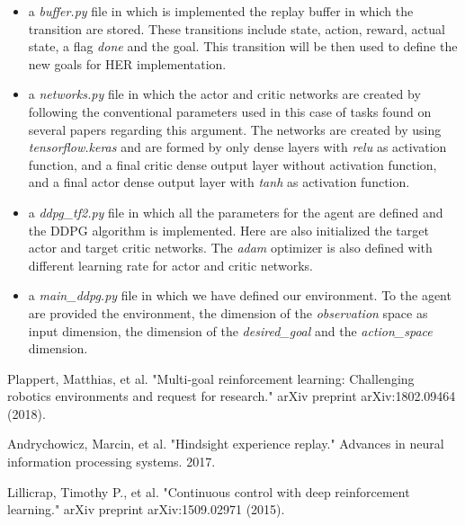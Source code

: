 \documentclass[a4paper]{report}
\begin{document}
\begin{itemize}
\item a \textit{buffer.py} file in which is implemented the replay buffer in which the transition are stored. These transitions include state, action, reward, actual state, a flag \textit{done} and the goal. This transition will be then used to define the new goals for HER implementation.

\item a \textit{networks.py} file in which the actor and critic networks are created by following the conventional parameters used in this case of tasks found on several papers regarding this argument. The networks are created by using \textit{tensorflow.keras} and are formed by only dense layers with \textit{relu} as activation function, and a final critic dense output layer without activation function, and a final actor dense output layer with \textit{tanh} as activation function.

\item a \textit{ddpg\_tf2.py} file in which all the parameters for the agent are defined and the DDPG algorithm is implemented. Here are also initialized the target actor and target critic networks. The \textit{adam} optimizer is also defined with different learning rate for actor and critic networks.

\item a \textit{main\_ddpg.py} file in which we have defined our environment. To the agent are provided the environment, the dimension of the \textit{observation} space as input dimension, the dimension of the \textit{desired\_goal} and the \textit{action\_space} dimension. 

\end{itemize}

\begin{thebibliography}{}

Plappert, Matthias, et al. "Multi-goal reinforcement learning: Challenging robotics environments and request for research." arXiv preprint arXiv:1802.09464 (2018).

Andrychowicz, Marcin, et al. "Hindsight experience replay." Advances in neural information processing systems. 2017.

Lillicrap, Timothy P., et al. "Continuous control with deep reinforcement learning." arXiv preprint arXiv:1509.02971 (2015).

\end{thebibliography}
\end{document}
